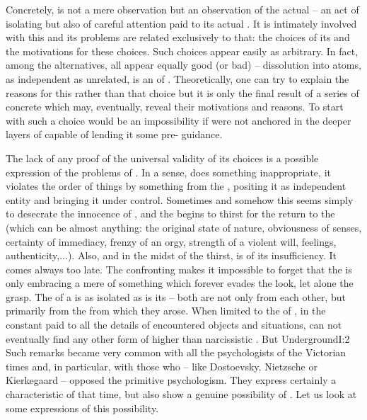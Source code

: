 Concretely,  is not a mere observation  but an
observation of the actual   -- an act of isolating  but also of careful attention paid to its actual . It
is intimately involved with this  and its problems are related
exclusively to that: the choices of its  and the motivations for
these choices.  Such choices appear easily as arbitrary. In fact, among the
 alternatives, all appear equally good (or bad) -- dissolution
into atoms, as independent as unrelated, is an  of .
Theoretically, one can 
try to explain the reasons for this rather than that choice but it is only the
final result of a series of concrete  which may, eventually,
reveal their motivations and reasons. To start with such a choice would be an
impossibility if  were not anchored in the deeper layers of
 capable of lending it some pre- guidance.

The lack of any proof of the universal validity of its choices is a
possible expression of the problems of .  In a sense,
 does something inappropriate, it violates the order of things by
 something from the , positing it as independent
entity and bringing it under  control. Sometimes and somehow this
seems simply to desecrate the innocence of , and the
 begins to thirst for the return to the  (which can be almost anything: the original
state of nature, obviousness of senses, certainty of immediacy, frenzy of an
orgy, strength of a violent will, feelings, authenticity,...). Also, and in the midst of
the thirst, 
 is  of its insufficiency. It comes always too late.
The confronting  makes it impossible to forget that the
 is only  embracing a mere 
of something which forever evades the look, let alone the grasp. The 
of a  is as isolated as is its  -- both are not
only  from each other, but primarily from the  from
which they arose. When limited to the  of , in
the constant  paid to all the details of encountered objects and
situations,  can not eventually find any other form of higher
 than narcissistic . 
But \citet{I swear,
  gentlemen, that to be too conscious is an illness -- a real thorough-going
  illness.}{Underground}{I:2} Such remarks became very common with all the
psychologists of the Victorian times and, in particular, with those who -- like
Dostoevsky, Nietzsche or Kierkegaard -- opposed the primitive psychologism. They
express certainly a characteristic of that time, 
but also show a genuine possibility of . Let us 
look at some expressions of this possibility. 

